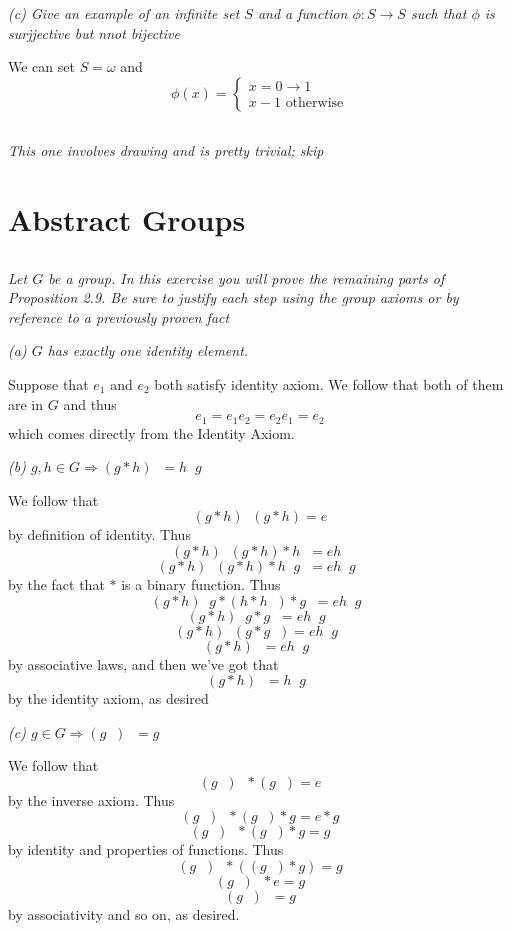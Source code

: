 \documentclass[11pt,oneside,titlepage]{book}
\DeclareMathOperator \inv {^{-1}}
\DeclareMathOperator \ra {\Rightarrow}
\begin{document}
\textit{(c) Give an example of an infinite set $S$ and a function
  $\phi: S \to S$ such that $\phi$ is surjjective but nnot bijective}

We can set $S = \omega$ and
$$\phi(x) =
\begin{cases}
  x = 0 \to 1 \\
  x - 1 \text{ otherwise}
\end{cases}
$$

\subsection{}

\textit{This one involves drawing and is pretty trivial; skip}

\section{Abstract Groups}


\subsection{}

\textit{Let $G$ be a group. In this exercise you will prove the remaining parts of
  Proposition 2.9. Be sure to justify each step using the group axioms or by reference to a
  previously proven fact}

\textit{(a) $G$ has exactly one identity element.}

Suppose that $e_1$ and $e_2$ both satisfy identity axiom. We follow
that both of them are in $G$ and thus
$$e_1 = e_1 e_2 = e_2 e_1 = e_2$$
which comes directly from the Identity Axiom.

\textit{(b) $g, h \in G \ra (g * h)\inv = h\inv g\inv$}

We follow that
$$(g * h)\inv  (g * h) = e$$
by definition of identity. Thus
$$(g * h)\inv  (g * h) * h\inv  = e h\inv$$
$$(g * h)\inv  (g * h) * h\inv  g\inv  = e h\inv g\inv$$
by the fact that $*$ is a binary function. Thus
$$(g * h)\inv  g * (h * h\inv) * g\inv  = e h\inv g\inv$$
$$(g * h)\inv  g * g\inv  = e h\inv g\inv$$
$$(g * h)\inv  (g * g\inv)  = e h\inv g\inv$$
$$(g * h)\inv = e h\inv g\inv$$
by associative laws, and then we've got that
$$(g * h)\inv = h\inv g\inv$$
by the identity axiom, as desired

\textit{(c) $g \in G \ra (g\inv) \inv = g$}

We follow that
$$(g\inv) \inv * (g\inv) = e$$
by the inverse axiom. Thus
$$(g\inv)\inv * (g\inv) * g  = e * g$$
$$(g\inv)\inv * (g\inv) * g  = g$$
by identity and properties of functions. Thus
$$(g\inv)\inv * ((g\inv) * g)  = g$$
$$(g\inv)\inv * e  = g$$
$$(g\inv)\inv  = g$$
by associativity and so on, as desired.
\end{document}
